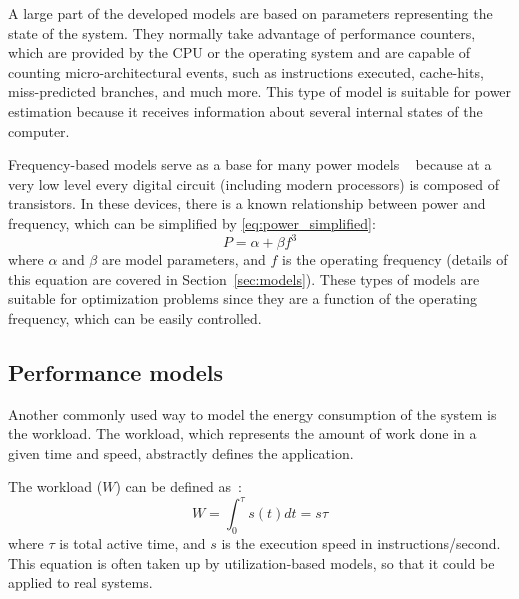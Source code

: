 A large part of the developed models are based on parameters representing the state of the system. They normally take advantage of performance counters, which are provided by the CPU or the operating system and are capable of counting micro-architectural events, such as instructions executed, cache-hits, miss-predicted branches, and much more. 
This type of model is suitable for power estimation because it receives information about several internal states of the computer.

Frequency-based models serve as a base for many power models ~\cite{Sarwar1997, Butzen2007, Usman2013ANoC} because at a very low level every digital circuit (including modern processors) is composed of transistors. In these devices, there is a known relationship between power and frequency, which can be simplified by \cref{eq:power_simplified}: 
\begin{equation}
P = \alpha+\beta f^3
\label{eq:power_simplified}
\end{equation}
where $\alpha$ and $\beta$ are model parameters, and $f$ is the operating frequency (details of this equation are covered in Section~\ref{sec:models}). These types of models are suitable for optimization problems since they are a function of the operating frequency, which can be easily controlled.

\subsection{Performance models}
Another commonly used way to model the energy consumption of the system is the workload. The workload, which represents the amount of work done in a given time and speed, abstractly defines the application.  

The workload ($W$) can be defined as~\cite{Paolillo2018OptimisationParallelism, Group2012HandbookSahni, Kim2015RacingHeuristics}:
\begin{equation}
W = \int_{0}^{\tau}s(t)dt = s\tau
\label{eq:workload_definition}
\end{equation}
where $\tau$ is total active time, and $s$ is the execution speed in instructions/second.
This equation is often taken up by utilization-based models, so that it could be applied to real systems. 

